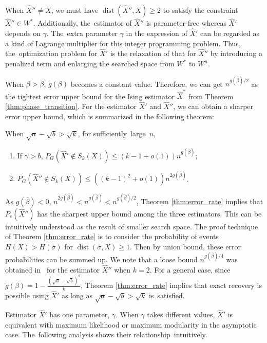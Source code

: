 \documentclass[entropy,article,accept,moreauthors,pdftex]{Definitions/mdpi}
\newcommand{\1}{\mathbbm{1}}
\DeclareMathOperator{\Dist}{dist}
\begin{document}
\begin{paracol}{2}
When $\hat{X}'' \neq X$, we must have $\Dist(\hat{X}'' ,X)\geq 2$ to satisfy the constraint $\hat{X}'' \in W^*$.
Additionally, the~estimator of $\hat{X}''$ is parameter-free whereas $\hat{X}'$ depends on $\gamma$. The~extra parameter $\gamma$ in the expression of
$\hat{X}'$ can be regarded as a kind of Lagrange multiplier for this integer programming problem. Thus, the~optimization problem for $\hat{X}'$
is the relaxation of that for $\hat{X}''$ by introducing a penalized term and enlarging the searched space from $W^*$ to $W^n$.

When $\beta > \bar{\beta}$, $\tilde{g}(\beta)$ becomes a constant value. Therefore, we can get $n^{g(\bar{\beta})/2}$ as the tightest error upper bound for the Ising estimator $\hat{X}^*$ from Theorem \ref{thm:phase_transition}.
For the estimator $\hat{X}'$ and $\hat{X}''$, we can obtain a sharper error upper bound, which is
summarized in the following theorem:
\begin{Theorem}\label{thm:error_rate}
When $\sqrt{a} - \sqrt{b} > \sqrt{k}$, for sufficiently~large~$n$, 
\begin{enumerate}
	\item If $\gamma > b$, $P_G(\hat{X}' \not\in S_k(X)) \leq (k-1+o(1))n^{g(\bar{\beta})}$;
	\item $P_G(\hat{X}'' \not\in S_k(X)) \leq ((k-1)^2+o(1))n^{2g(\bar{\beta})}$.
\end{enumerate}
\end{Theorem}
As $g(\bar{\beta})<0$, $n^{2g(\bar{\beta})} < n^{g(\bar{\beta})} < n^{g(\bar{\beta})/2}$,
Theorem \ref{thm:error_rate} implies that $P_e(\hat{X}'')$ has the sharpest upper bound among the three estimators.
This can be intuitively understood as the result of smaller search space.
The proof technique of Theorem \ref{thm:error_rate} is to consider the probability of events $H(X) > H(\bar{\sigma})$
for $\Dist(\bar{\sigma}, X) \geq 1$. Then by union bound, these error probabilities can be summed up.
We note that a loose bound $n^{g(\bar{\beta})/4}$ was obtained in~\cite{abbe2015exact} for the estimator $\hat{X}''$ when $k=2$.
For a general case, since $\tilde{g}(\beta) = 1- \frac{(\sqrt{a} - \sqrt{b})^2}{k}$, Theorem \ref{thm:error_rate} implies that exact recovery is possible using $\hat{X}'$ as long as  
$\sqrt{a} - \sqrt{b} > \sqrt{k}$ is~satisfied.


Estimator $\hat{X}'$ has one parameter, $\gamma$. When $\gamma$ takes different values, $\hat{X}'$
is equivalent with maximum likelihood or maximum modularity in the asymptotic case. The~following analysis shows
their relationship~intuitively.


\end{paracol}
\end{document}
